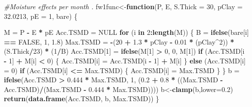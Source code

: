 \documentclass[
  10pt,
  b5paper,
]{book}
\newenvironment{Shaded}{\begin{snugshade}}{\end{snugshade}}
\newcommand{\CommentTok}[1]{\textcolor[rgb]{0.56,0.35,0.01}{\textit{#1}}}
\newcommand{\ControlFlowTok}[1]{\textcolor[rgb]{0.13,0.29,0.53}{\textbf{#1}}}
\newcommand{\DataTypeTok}[1]{\textcolor[rgb]{0.13,0.29,0.53}{#1}}
\newcommand{\DecValTok}[1]{\textcolor[rgb]{0.00,0.00,0.81}{#1}}
\newcommand{\FloatTok}[1]{\textcolor[rgb]{0.00,0.00,0.81}{#1}}
\newcommand{\KeywordTok}[1]{\textcolor[rgb]{0.13,0.29,0.53}{\textbf{#1}}}
\newcommand{\NormalTok}[1]{#1}
\newcommand{\OperatorTok}[1]{\textcolor[rgb]{0.81,0.36,0.00}{\textbf{#1}}}
\newcommand{\OtherTok}[1]{\textcolor[rgb]{0.56,0.35,0.01}{#1}}
\newcommand{\StringTok}[1]{\textcolor[rgb]{0.31,0.60,0.02}{#1}}
\begin{document}
\begin{Shaded}
\begin{Highlighting}[]
\CommentTok{#Moisture effects per month . }
\NormalTok{fw1func<-}\ControlFlowTok{function}\NormalTok{(P, E, }\DataTypeTok{S.Thick =} \DecValTok{30}\NormalTok{, }\DataTypeTok{pClay =} \FloatTok{32.0213}\NormalTok{, }\DataTypeTok{pE =} \DecValTok{1}\NormalTok{, bare) }
\NormalTok{\{}
   
\NormalTok{    M =}\StringTok{ }\NormalTok{P }\OperatorTok{-}\StringTok{ }\NormalTok{E }\OperatorTok{*}\StringTok{ }\NormalTok{pE}
\NormalTok{    Acc.TSMD =}\StringTok{ }\OtherTok{NULL}
    \ControlFlowTok{for}\NormalTok{ (i }\ControlFlowTok{in} \DecValTok{2}\OperatorTok{:}\KeywordTok{length}\NormalTok{(M)) \{}
\NormalTok{    B =}\StringTok{ }\KeywordTok{ifelse}\NormalTok{(bare[i] }\OperatorTok{==}\StringTok{ }\OtherTok{FALSE}\NormalTok{, }\DecValTok{1}\NormalTok{, }\FloatTok{1.8}\NormalTok{)}
\NormalTok{     Max.TSMD =}\StringTok{ }\OperatorTok{-}\NormalTok{(}\DecValTok{20} \OperatorTok{+}\StringTok{ }\FloatTok{1.3} \OperatorTok{*}\StringTok{ }\NormalTok{pClay }\OperatorTok{-}\StringTok{ }\FloatTok{0.01} \OperatorTok{*}\StringTok{ }\NormalTok{(pClay}\OperatorTok{^}\DecValTok{2}\NormalTok{)) }\OperatorTok{*}\StringTok{ }\NormalTok{(S.Thick}\OperatorTok{/}\DecValTok{23}\NormalTok{) }\OperatorTok{*}\StringTok{ }\NormalTok{(}\DecValTok{1}\OperatorTok{/}\NormalTok{B)}
\NormalTok{        Acc.TSMD[}\DecValTok{1}\NormalTok{] =}\StringTok{ }\KeywordTok{ifelse}\NormalTok{(M[}\DecValTok{1}\NormalTok{] }\OperatorTok{>}\StringTok{ }\DecValTok{0}\NormalTok{, }\DecValTok{0}\NormalTok{, M[}\DecValTok{1}\NormalTok{])}
        \ControlFlowTok{if}\NormalTok{ (Acc.TSMD[i }\OperatorTok{-}\StringTok{ }\DecValTok{1}\NormalTok{] }\OperatorTok{+}\StringTok{ }\NormalTok{M[i] }\OperatorTok{<}\StringTok{ }\DecValTok{0}\NormalTok{) \{}
\NormalTok{            Acc.TSMD[i] =}\StringTok{ }\NormalTok{Acc.TSMD[i }\OperatorTok{-}\StringTok{ }\DecValTok{1}\NormalTok{] }\OperatorTok{+}\StringTok{ }\NormalTok{M[i]}
\NormalTok{        \}}
        \ControlFlowTok{else}\NormalTok{ (Acc.TSMD[i] =}\StringTok{ }\DecValTok{0}\NormalTok{)}
        \ControlFlowTok{if}\NormalTok{ (Acc.TSMD[i] }\OperatorTok{<=}\StringTok{ }\NormalTok{Max.TSMD) \{}
\NormalTok{            Acc.TSMD[i] =}\StringTok{ }\NormalTok{Max.TSMD}
\NormalTok{        \}}
\NormalTok{    \}}
\NormalTok{    b =}\StringTok{ }\KeywordTok{ifelse}\NormalTok{(Acc.TSMD }\OperatorTok{>}\StringTok{ }\FloatTok{0.444} \OperatorTok{*}\StringTok{ }\NormalTok{Max.TSMD, }\DecValTok{1}\NormalTok{, (}\FloatTok{0.2} \OperatorTok{+}\StringTok{ }\FloatTok{0.8} \OperatorTok{*}\StringTok{ }\NormalTok{((Max.TSMD }\OperatorTok{-}\StringTok{ }
\StringTok{        }\NormalTok{Acc.TSMD)}\OperatorTok{/}\NormalTok{(Max.TSMD }\OperatorTok{-}\StringTok{ }\FloatTok{0.444} \OperatorTok{*}\StringTok{ }\NormalTok{Max.TSMD))))}
\NormalTok{    b<-}\KeywordTok{clamp}\NormalTok{(b,}\DataTypeTok{lower=}\FloatTok{0.2}\NormalTok{)}
    \KeywordTok{return}\NormalTok{(}\KeywordTok{data.frame}\NormalTok{(Acc.TSMD, b, Max.TSMD))}
\NormalTok{\}}


\end{Highlighting}
\end{Shaded}
\end{document}

